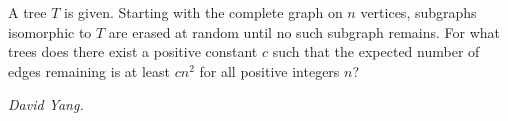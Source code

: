 A tree $T$ is given. Starting with the complete graph on $n$ vertices, subgraphs isomorphic to $T$ are erased at random until no such subgraph remains. For what trees does there exist a positive constant $c$ such that the expected number of edges remaining is at least $cn^2$ for all positive integers $n$?

\textit{David Yang.}